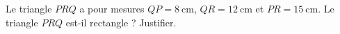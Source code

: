 
\begin{exercice}\label{exosmath-0956}

    Le triangle \( PRQ\) a pour mesures \( QP=\SI{8}{\centi\meter}\), \( QR=\SI{12}{\centi\meter}\) et \( PR=\SI{15}{\centi\meter}\). Le triangle \( PRQ\) est-il rectangle ? Justifier.

\end{exercice}
